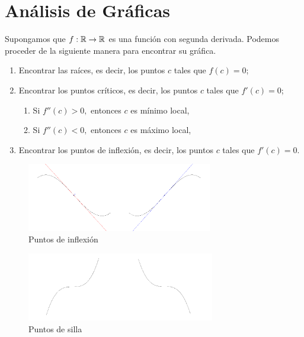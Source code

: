 \section{Análisis de Gráficas}


    Supongamos que $f:\mathbb{R} \to \mathbb{R}$ es una función con segunda derivada. Podemos proceder de la siguiente manera para encontrar su
    gráfica.
    \begin{enumerate}
        \item Encontrar las raíces, es decir, los puntos $c$ tales que $f(c)=0$;
        \item Encontrar los puntos críticos, es decir, los puntos $c$ tales que $f'(c)=0$;
        \begin{enumerate}
            \item Si $f''(c)>0,$ entonces $c$ es mínimo local,
            \item Si $f''(c)<0,$ entonces $c$ es máximo local,
        \end{enumerate}
        \item Encontrar los puntos de inflexión, es decir, los puntos $c$ tales que $f'(c)=0$.
    \end{enumerate}



    \begin{figure}
        \centering
        \includegraphics[height=3cm,bb=0 0 736 272,keepaspectratio=true]{./calculo/puntos_inflexion.png}
        \caption{Puntos de inflexión}
        \label{fig:inflexion}
    \end{figure}


    \begin{figure}
        \centering
        \includegraphics[height=3cm,bb=0 0 735 268,keepaspectratio=true]{./calculo/puntos_silla.png}
        \caption{Puntos de silla}
        \label{fig:silla}
    \end{figure}



